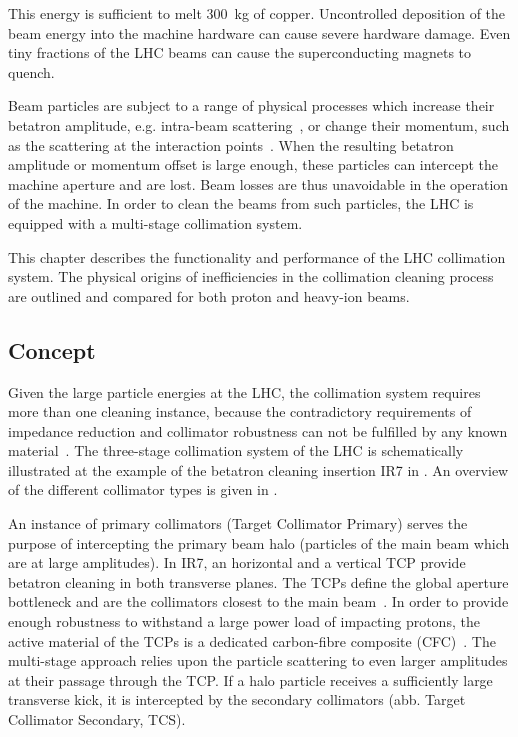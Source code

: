 This energy is sufficient to melt 300~kg of copper. Uncontrolled deposition of the beam energy into the machine hardware can cause severe hardware damage. Even tiny fractions of the LHC beams can cause the superconducting magnets to quench.

Beam particles are subject to a range of physical processes which increase their betatron amplitude, e.g. intra-beam scattering~\cite{Mertens:1364596}, or change their momentum, such as the scattering at the interaction points~\cite{Bruce2014a}. When the resulting betatron amplitude or momentum offset is large enough, these particles can intercept the machine aperture and are lost. Beam losses are thus unavoidable in the operation of the machine. In order to clean the beams from such particles, the LHC is equipped with a multi-stage collimation system. 

This chapter describes the functionality and performance of the LHC collimation system. The physical origins of inefficiencies in the collimation cleaning process are outlined and compared for both proton and heavy-ion beams.  

%

%
%
\subsection{Concept}
%



Given the large particle energies at the LHC, the collimation system requires more than one cleaning instance, because the contradictory requirements of impedance reduction and collimator robustness can not be fulfilled by any known material~\citedr. The three-stage collimation system of the LHC is schematically illustrated at the example of the betatron cleaning insertion IR7 in . An overview of the different collimator types is given in .

An instance of primary collimators (Target Collimator Primary) serves the purpose of intercepting the primary beam halo (particles of the main beam which are at large amplitudes). In IR7, an horizontal and a vertical TCP provide betatron cleaning in both transverse planes. The TCPs define the global aperture bottleneck and are the collimators closest to the main beam~\citedr. In order to provide enough robustness to withstand a large power load of impacting protons, the active material of the TCPs is a dedicated carbon-fibre composite (CFC)~\citedr. The multi-stage approach relies upon the particle scattering to even larger amplitudes at their passage through the TCP. If a halo particle receives a sufficiently large transverse kick, it is intercepted by the secondary collimators (abb. Target Collimator Secondary, TCS). 

